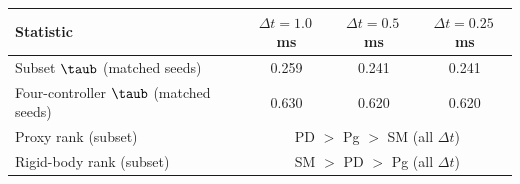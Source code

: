 \begin{tabular}{lccc}
\toprule
Statistic & $\Delta t = 1.0$\,ms & $\Delta t = 0.5$\,ms & $\Delta t = 0.25$\,ms \\
\midrule
Subset $\taub$ (matched seeds) & 0.259 & 0.241 & 0.241 \\
Four-controller $\taub$ (matched seeds) & 0.630 & 0.620 & 0.620 \\
Proxy rank (subset) & \multicolumn{3}{c}{PD $>$ Pg $>$ SM (all $\Delta t$)} \\
Rigid-body rank (subset) & \multicolumn{3}{c}{SM $>$ PD $>$ Pg (all $\Delta t$)} \\
\bottomrule
\end{tabular}
